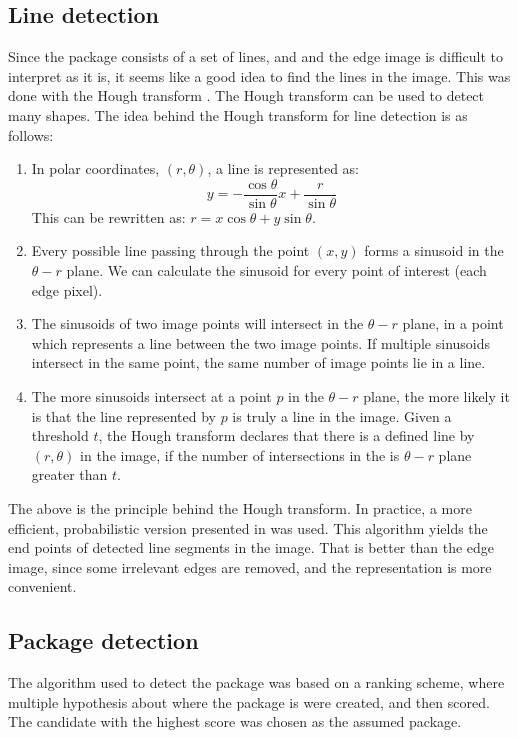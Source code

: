 \subsection{Line detection} %
Since the package consists of a set of lines, and and the edge image is difficult to interpret as it is, it seems like a good idea to find the lines in the image.
This was done with the Hough transform \cite{illingworth1988survey}.
The Hough transform can be used to detect many shapes.
The idea behind the Hough transform for line detection is as follows:
\begin{enumerate}
	\item In polar coordinates, $(r, \theta)$, a line is represented as: $$y = -\frac{\cos \theta}{\sin \theta} x + \frac{r}{\sin \theta}$$ This can be rewritten as: $r = x \cos \theta + y \sin \theta$. 
	\item Every possible line passing through the point $(x,y)$ forms a sinusoid in the $\theta - r$ plane. We can calculate the sinusoid for every point of interest (each edge pixel).
	\item The sinusoids of two image points will intersect in the $\theta - r$ plane, in a point which represents a line between the two image points. If multiple sinusoids intersect in the same point, the same number of image points lie in a line.
	\item The more sinusoids intersect at a point $p$ in the $\theta - r$ plane, the more likely it is that the line represented by $p$ is truly a line in the image. Given a threshold $t$, the Hough transform declares that there is a defined line by $(r, \theta)$ in the image, if the number of intersections in the is $\theta - r$ plane greater than $t$.
\end{enumerate}
The above is the principle behind the Hough transform.
In practice, a more efficient, probabilistic version presented in \cite{houghp} was used. 
This algorithm yields the end points of detected line segments in the image.
That is better than the edge image, since some irrelevant edges are removed, and the representation is more convenient.

\subsection{Package detection}
The algorithm used to detect the package was based on a ranking scheme, where multiple hypothesis about where the package is were created, and then scored. 
The candidate with the highest score was chosen as the assumed package. 

